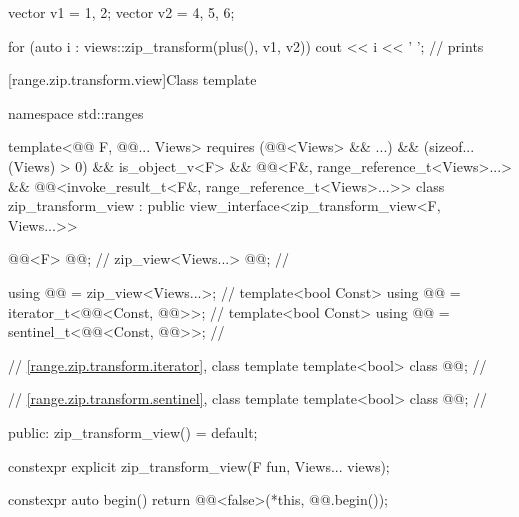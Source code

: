 \pnum
\begin{example}
\begin{codeblock}
vector v1 = {1, 2};
vector v2 = {4, 5, 6};

for (auto i : views::zip_transform(plus(), v1, v2)) {
  cout << i << ' ';     // prints 
}
\end{codeblock}
\end{example}

[range.zip.transform.view]{Class template }

%
%
%
%
\begin{codeblock}
namespace std::ranges {
  template<@@ F, @@... Views>
    requires (@@<Views> && ...) && (sizeof...(Views) > 0) && is_object_v<F> &&
              @@<F&, range_reference_t<Views>...> &&
              @@<invoke_result_t<F&, range_reference_t<Views>...>>
  class zip_transform_view : public view_interface<zip_transform_view<F, Views...>> {
    @@<F> @@;                    // \expos
    zip_view<Views...> @@;                // \expos

    using @@ = zip_view<Views...>;   // \expos
    template<bool Const>
      using @@ = iterator_t<@@<Const, @@>>;      // \expos
    template<bool Const>
      using @@ = sentinel_t<@@<Const, @@>>;       // \expos

    // \ref{range.zip.transform.iterator}, class template 
    template<bool> class @@;          // \expos

    // \ref{range.zip.transform.sentinel}, class template 
    template<bool> class @@;          // \expos

  public:
    zip_transform_view() = default;

    constexpr explicit zip_transform_view(F fun, Views... views);

    constexpr auto begin() { return @@<false>(*this, @@.begin()); }

}}
\end{codeblock}
